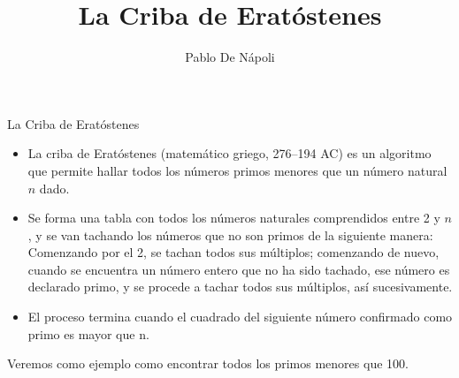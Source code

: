 \documentclass{beamer}
\begin{document}


\title{La Criba de Eratóstenes}
\author{Pablo De Nápoli}
\maketitle

\begin{frame}{La Criba de Eratóstenes}

 \begin{itemize}
 
 \item   La \alert{criba de Eratóstenes} (matemático griego, 276--194 AC) es un algoritmo que permite hallar todos los números primos menores que un 
 número natural $n$ dado. 
\item Se forma una tabla con todos los números naturales comprendidos entre 2 y $n$, 
 y se van tachando los números que no son primos de la siguiente manera: Comenzando por el 2, se tachan todos 
 sus múltiplos; comenzando de nuevo, cuando se encuentra un número entero que no ha sido tachado, ese número es 
 declarado \alert{primo}, y se procede a tachar todos sus múltiplos, así sucesivamente. 
 
\item El proceso termina cuando el cuadrado del siguiente número confirmado como primo es mayor que n.

\end{itemize}

Veremos como ejemplo como encontrar todos los primos menores que 100.

\end{frame}
\end{document}

